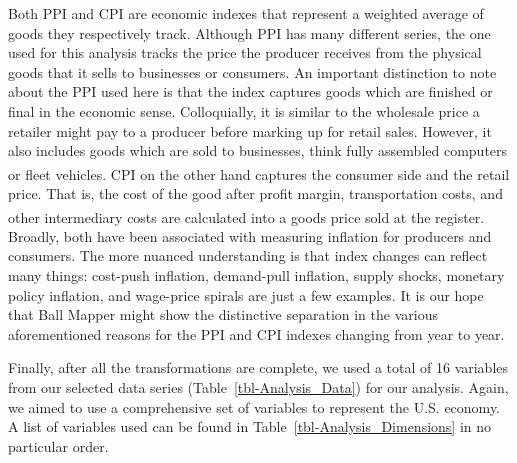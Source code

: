 \documentclass[
  10pt,
  letterpaper,
  DIV=11,
  numbers=noendperiod]{scrartcl}
\begin{document}
Both PPI and CPI are economic indexes that represent a weighted average
of goods they respectively track. Although PPI has many different
series, the one used for this analysis tracks the price the producer
receives from the physical goods that it sells to businesses or
consumers. An important distinction to note about the PPI used here is
that the index captures goods which are finished or final in the
economic sense. Colloquially, it is similar to the wholesale price a
retailer might pay to a producer before marking up for retail sales.
However, it also includes goods which are sold to businesses, think
fully assembled computers or fleet
vehicles.\textsuperscript{}
CPI on the other hand captures the consumer side and the retail price.
That is, the cost of the good after profit margin, transportation costs,
and other intermediary costs are calculated into a goods price sold at
the
register.\textsuperscript{}
Broadly, both have been associated with measuring inflation for
producers and consumers. The more nuanced understanding is that index
changes can reflect many things: cost-push inflation, demand-pull
inflation, supply shocks, monetary policy inflation, and wage-price
spirals are just a few examples. It is our hope that Ball Mapper might
show the distinctive separation in the various aforementioned reasons
for the PPI and CPI indexes changing from year to year.

Finally, after all the transformations are complete, we used a total of
16 variables from our selected data series
(Table~\ref{tbl-Analysis_Data}) for our analysis. Again, we aimed to use
a comprehensive set of variables to represent the U.S. economy. A list
of variables used can be found in Table~\ref{tbl-Analysis_Dimensions} in
no particular order.

\begin{table}[H]


\caption{\label{tbl-Analysis_Dimensions}Variables inculded in Ball
Mapper Point Cloud}

\end{table}%
\end{document}
